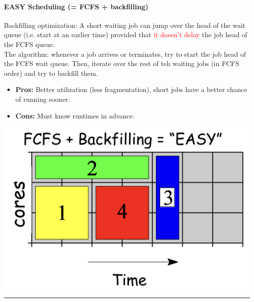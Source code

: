 \documentclass[openany,12pt]{book}
\newcommand{\red}[1]{\textcolor{Red}{#1}}
\begin{document}
\begin{center}
  \begin{minipage}{0.65\textwidth}
    \vspace{0pt} %
    \paragraph{EASY Scheduling (= FCFS + backfilling)} Backfilling optimization: A short waiting job can jump over the head of the wait queue (i.e. start at an earlier time) provided that \red{it doesn't delay} the job \@ head of the FCFS queue.\\

    The algorithm: whenever a job arrives or terminates, try to start the job \@ head of the FCFS wait queue. Then, iterate over the rest of teh waiting jobs (in FCFS order) and try to backfill them.

    \begin{itemize}
      \item \textbf{Pros:} Better utilization (less fragmentation), short jobs have a better chance of running sooner.
      \item \textbf{Cons:} Must know runtimes in advance.
    \end{itemize}
  \end{minipage}\hfill
  \begin{minipage}{0.3\textwidth}
    \vspace{0pt} %
    \centering
    \includegraphics[width=\linewidth]{EASY.png}
  \end{minipage}
\end{center}

\noindent\rule{\linewidth}{0.4pt}
\end{document}
